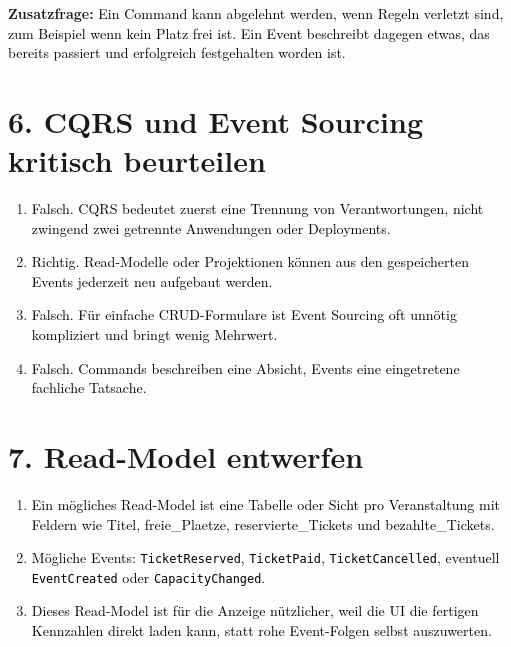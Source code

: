 \documentclass[11pt,a4paper]{article}
\newcommand{\solution}[1]{\textcolor{black}{#1}}
\begin{document}
\textbf{Zusatzfrage:}
\solution{Ein Command kann abgelehnt werden, wenn Regeln verletzt sind, zum Beispiel wenn kein Platz frei ist. Ein Event beschreibt dagegen etwas, das bereits passiert und erfolgreich festgehalten worden ist.}

\section*{6. CQRS und Event Sourcing kritisch beurteilen}
\begin{enumerate}
  \item \solution{Falsch. CQRS bedeutet zuerst eine Trennung von Verantwortungen, nicht zwingend zwei getrennte Anwendungen oder Deployments.}
  \item \solution{Richtig. Read-Modelle oder Projektionen können aus den gespeicherten Events jederzeit neu aufgebaut werden.}
  \item \solution{Falsch. Für einfache CRUD-Formulare ist Event Sourcing oft unnötig kompliziert und bringt wenig Mehrwert.}
  \item \solution{Falsch. Commands beschreiben eine Absicht, Events eine eingetretene fachliche Tatsache.}
\end{enumerate}

\section*{7. Read-Model entwerfen}
\begin{enumerate}
  \item \solution{Ein mögliches Read-Model ist eine Tabelle oder Sicht pro Veranstaltung mit Feldern wie Titel, freie\_Plaetze, reservierte\_Tickets und bezahlte\_Tickets.}
  \item \solution{Mögliche Events: \texttt{TicketReserved}, \texttt{TicketPaid}, \texttt{TicketCancelled}, eventuell \texttt{EventCreated} oder \texttt{CapacityChanged}.}
  \item \solution{Dieses Read-Model ist für die Anzeige nützlicher, weil die UI die fertigen Kennzahlen direkt laden kann, statt rohe Event-Folgen selbst auszuwerten.}
\end{enumerate}
\end{document}
